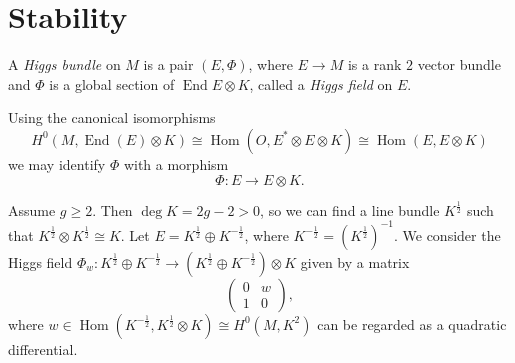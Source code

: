 \documentclass[A4paper, 12pt, british, reqno]{amsart}
\DeclareMathOperator{\Hom}{Hom}
\DeclareMathOperator{\End}{End}
\newcommand{\ot}{\otimes}
\newcommand{\op}{\oplus}
\newcommand{\dual}{^{*}}
\begin{document}
\section{Stability}


%
%
%

\begin{defn}
    A \textit{Higgs bundle} on $M$ is a pair $(E,\Phi)$, where $E\to M$ is a rank $2$ vector bundle and $\Phi$ is a global section of $\End{E}\ot K$, called a \textit{Higgs field} on $E$.
\end{defn}

\begin{rem}
    Using the canonical isomorphisms
    \[ H^{0}(M,\End(E)\ot K)\cong \Hom(O,E\dual \ot E\ot K)\cong \Hom(E,E\ot K) \]
    we may identify $\Phi$ with a morphism
    \[ \Phi\colon E\to E\ot K. \]
\end{rem}


\begin{exa}
    Assume $g\geqslant 2$.
    Then $\deg{K}=2g-2>0$, so we can find a line bundle $K^{\frac{1}{2}}$ such that $K^{\frac{1}{2}}\ot K^{\frac{1}{2}}\cong K$.
    Let $E=K^{\frac{1}{2}}\op K^{-\frac{1}{2}}$, where $K^{-\frac{1}{2}}=(K^{\frac{1}{2}})^{-1}$.
    We consider the Higgs field $\Phi_{w}\colon K^{\frac{1}{2}}\op K^{-\frac{1}{2}}\to (K^{\frac{1}{2}}\op K^{-\frac{1}{2}})\ot K$ given by a matrix
    \[
	\begin{pmatrix}
	    0 & w \\
	    1 & 0
	\end{pmatrix},
    \]
    where $w\in \Hom(K^{-\frac{1}{2}},K^{\frac{1}{2}}\ot K)\cong H^{0}(M,K^{2})$ can be regarded as a quadratic differential.
\end{exa}
\end{document}
